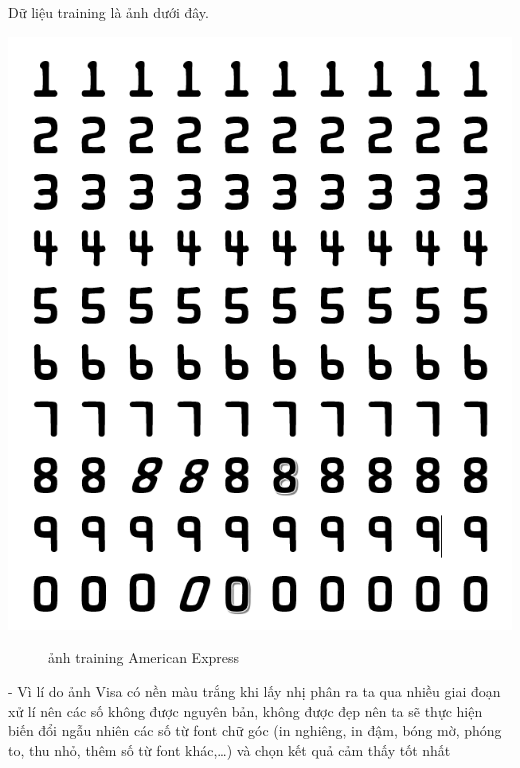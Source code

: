     \quad Dữ liệu training là ảnh dưới đây.
\begin{center}
    \includegraphics[scale = 0.5]{images/americanexpress/training.png}
\end{center}
\begin{figure}[htp]
    \caption{ảnh training American Express}
\end{figure}

-	Vì lí do ảnh Visa có nền màu trắng khi lấy nhị phân ra ta qua nhiều giai đoạn xử lí nên các số không được nguyên bản, không được đẹp nên ta sẽ thực hiện biến đổi ngẫu nhiên các số từ font chữ góc (in nghiêng, in đậm, bóng mờ, phóng to, thu nhỏ, thêm số từ font khác,…) và chọn kết quả cảm thấy tốt nhất \\[0.3cm]

